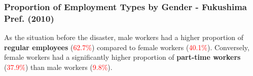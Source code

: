 \documentclass[serif, aspectratio=169]{beamer}
\newcommand{\returnbutton}[2]{%
  \vspace{-1.0cm}  %
  \hfill  %
  \hyperlink{#1}{%
    {\footnotesize\beamerbutton{#2}}%
  }%
  \vspace{0.3cm}  %
}
\begin{document}


\begin{frame}[label=proportion_of_employment_type]
\frametitle{Proportion of Employment Types by Gender - Fukushima Pref. (2010)}






\vspace{0.25cm} 
\returnbutton{different_types}{Return}

As the situation before the disaster, male workers had a higher proportion of \textbf{regular employees} (\textcolor{red}{62.7\%}) compared to female workers (\textcolor{red}{40.1\%}). Conversely, female workers had a significantly higher proportion of \textbf{part-time workers} (\textcolor{red}{37.9\%}) than male workers (\textcolor{red}{9.8\%}).

\vspace{1.0em} %

\centering %

\end{frame}
\end{document}
